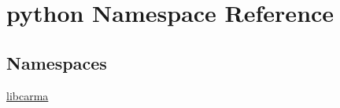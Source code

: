 \hypertarget{namespacepython}{\section{python Namespace Reference}
\label{namespacepython}
}
\subsection*{Namespaces}
\begin{DoxyCompactItemize}
\item 
\hyperlink{namespacepython_1_1libcarma}{libcarma}
\end{DoxyCompactItemize}

